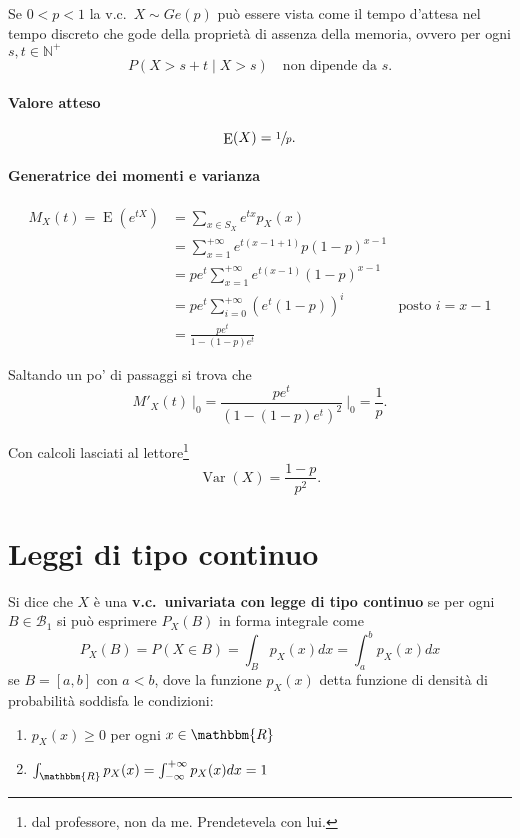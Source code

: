 \documentclass[11pt,a4paper,twoside]{article}
\let\geq\geqslant%
\newcommand\N{\mathbb{N}}
\newcommand\R{\mathbbm{R}}
\newcommand\B{\mathcal{B}}
\newcommand\computedat{\:\bigg\rvert}
\DeclareMathOperator{\Var}{Var}
\DeclareMathOperator{\E}{E}
\begin{document}
Se \(0 < p < 1\) la v.c.\ \(X\sim Ge(p)\) può essere vista come il
tempo d'attesa nel tempo discreto che gode della proprietà di assenza
della memoria, ovvero per ogni \(s,t \in \N^+\)
\[
  P(X>s+t \mid X>s) \quad\mbox{non dipende da } s.
\]

\paragraph{Valore atteso}
\[
  \E(X) = \sfrac{1}{p}.
\]

\paragraph{Generatrice dei momenti e varianza}
\begin{align*}
  M_X(t) = \E(e^{tX})
  &= \sum_{x\in S_X} e^{tx} p_X(x)  &\\
  &= \sum_{x=1}^{+\infty} e^{t(x-1+1)}p(1-p)^{x-1} &\\
  &= pe^t \sum_{x=1}^{+\infty} e^{t(x-1)}(1-p)^{x-1} &\\
  &= pe^t \sum_{i=0}^{+\infty} (e^t(1-p))^i &\mbox{posto } i = x-1 \\
  &= \frac{ pe^t }{ 1-(1-p)e^t }
\end{align*}

Saltando un po' di passaggi si trova che
\[
  M'_X(t) \computedat_0
  = \frac{pe^t}{\left( 1-(1-p)e^t \right)^2} \computedat_0
  = \frac{1}{p}.
\]

Con calcoli lasciati al lettore\footnote{dal professore, non da
  me. Prendetevela con lui.}
\[
  \Var(X) = \frac{1-p}{p^2}.
\]

\section{Leggi di tipo continuo}

Si dice che \(X\) è una \textbf{v.c.\ univariata con legge di tipo
  continuo} se per ogni \(B\in\B_1\) si può esprimere \(P_X(B)\) in
forma integrale come
\[
  P_X(B) = P(X\in B) = \int_B p_X(x)dx = \int_a^b p_X(x) dx
\]
se \(B = [a,b]\) con \(a < b\), dove la funzione \(p_X(x)\) detta
funzione di densità di probabilità soddisfa le condizioni:
\begin{enumerate}
\item \(p_X(x) \geq 0\) per ogni \(x\in\R\)
\item \(\int_\R p_X(x) = \int_{-\infty}^{+\infty} p_X(x) dx = 1\)
\end{enumerate}
\end{document}
